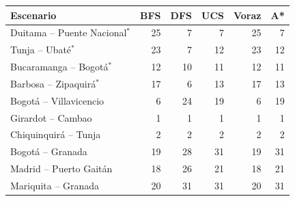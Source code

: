 \begin{tabular}{lrrrrr}
\toprule
\textbf{Escenario} & \textbf{BFS} & \textbf{DFS} & \textbf{UCS} & \textbf{Voraz} & \textbf{A*} \\
\midrule
Duitama -- Puente Nacional$^{*}$ & 25 & 7 & 7 & 25 & 7 \\
Tunja -- Ubaté$^{*}$ & 23 & 7 & 12 & 23 & 12 \\
Bucaramanga -- Bogotá$^{*}$ & 12 & 10 & 11 & 12 & 11 \\
Barbosa -- Zipaquirá$^{*}$ & 17 & 6 & 13 & 17 & 13 \\
Bogotá -- Villavicencio & 6 & 24 & 19 & 6 & 19 \\
Girardot -- Cambao & 1 & 1 & 1 & 1 & 1 \\
Chiquinquirá -- Tunja & 2 & 2 & 2 & 2 & 2 \\
Bogotá -- Granada & 19 & 28 & 31 & 19 & 31 \\
Madrid -- Puerto Gaitán & 18 & 26 & 21 & 18 & 21 \\
Mariquita -- Granada & 20 & 31 & 31 & 20 & 31 \\
\bottomrule
\end{tabular}
